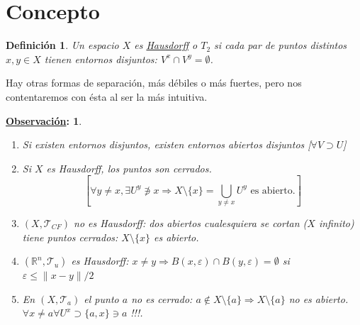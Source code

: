 \documentclass[10pt,a4paper,openright]{book}
\theoremstyle{break}
\newtheorem*{defi}{Definición}
\newtheorem*{obs}{\underline{Observación}:}
\begin{document}
\section{Concepto}%
\label{sec:concepto}
\begin{defi}
Un espacio $X$ es \underline{Hausdorff} o $T_2$ si cada par de puntos distintos $x, y \in X$ tienen entornos disjuntos: $V^x \cap V^y = \emptyset$. 
\end{defi}
Hay otras formas de separación, más débiles o más fuertes, pero nos contentaremos con ésta al ser la más intuitiva.
\begin{obs}
\begin{enumerate}
    \item Si existen entornos disjuntos, existen entornos abiertos disjuntos [$\forall V \supset U$]
    \item Si $X$ es Hausdorff, los puntos son cerrados.
    \[
    \left[ \forall y \neq x, \exists U^y \not\ni x \Rightarrow X \setminus \{x\} = \bigcup_{y \neq x} U^y  \text{ es abierto.} \right] 
    \]
    \item $\left( X, \mathcal{T}_{CF} \right)$ no es Hausdorff: dos abiertos cualesquiera se cortan ($X$ infinito) tiene puntos cerrados: $X\setminus \{x\}$ es abierto.

    \item $\left( \mathbb{R}^n, \mathcal{T}_{u} \right)$ es Hausdorff: $x \neq y \Rightarrow B\left( x, \varepsilon \right) \cap B\left( y, \varepsilon \right) = \emptyset$ si $\varepsilon \le \lVert x - y \rVert / 2$

    \item En $\left( X, \mathcal{T}_a \right)$ el punto $a$ no es cerrado: $a \not\in X \setminus \{a\} \Rightarrow X \setminus \{a\}$ no es abierto. $\forall x \neq a \forall U^x \supset \{a, x\} \ni a$ !!!.
\end{enumerate}
\end{obs}
\end{document}
